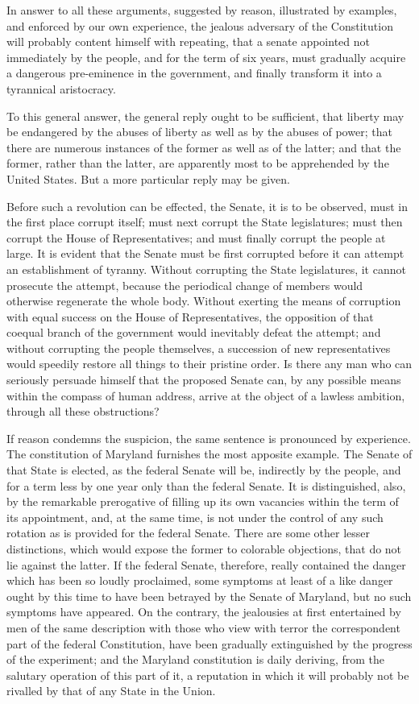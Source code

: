 In answer to all these arguments, suggested by reason, illustrated by examples, and enforced by our own experience, the jealous adversary of the Constitution will probably content himself with repeating, that a senate appointed not immediately by the people, and for the term of six years, must gradually acquire a dangerous pre-eminence in the government, and finally transform it into a tyrannical aristocracy.

To this general answer, the general reply ought to be sufficient, that liberty may be endangered by the abuses of liberty as well as by the abuses of power; that there are numerous instances of the former as well as of the latter; and that the former, rather than the latter, are apparently most to be apprehended by the United States. 
But a more particular reply may be given.

Before such a revolution can be effected, the Senate, it is to be observed, must in the first place corrupt itself; must next corrupt the State legislatures; must then corrupt the House of Representatives; and must finally corrupt the people at large. 
It is evident that the Senate must be first corrupted before it can attempt an establishment of tyranny. 
Without corrupting the State legislatures, it cannot prosecute the attempt, because the periodical change of members would otherwise regenerate the whole body. 
Without exerting the means of corruption with equal success on the House of Representatives, the opposition of that coequal branch of the government would inevitably defeat the attempt; and without corrupting the people themselves, a succession of new representatives would speedily restore all things to their pristine order. 
Is there any man who can seriously persuade himself that the proposed Senate can, by any possible means within the compass of human address, arrive at the object of a lawless ambition, through all these obstructions?

If reason condemns the suspicion, the same sentence is pronounced by experience. 
The constitution of Maryland furnishes the most apposite example. 
The Senate of that State is elected, as the federal Senate will be, indirectly by the people, and for a term less by one year only than the federal Senate. 
It is distinguished, also, by the remarkable prerogative of filling up its own vacancies within the term of its appointment, and, at the same time, is not under the control of any such rotation as is provided for the federal Senate. 
There are some other lesser distinctions, which would expose the former to colorable objections, that do not lie against the latter. 
If the federal Senate, therefore, really contained the danger which has been so loudly proclaimed, some symptoms at least of a like danger ought by this time to have been betrayed by the Senate of Maryland, but no such symptoms have appeared. 
On the contrary, the jealousies at first entertained by men of the same description with those who view with terror the correspondent part of the federal Constitution, have been gradually extinguished by the progress of the experiment; and the Maryland constitution is daily deriving, from the salutary operation of this part of it, a reputation in which it will probably not be rivalled by that of any State in the Union.


